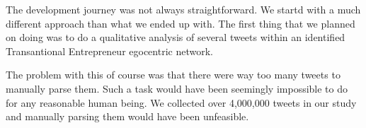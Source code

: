 The development journey was not always straightforward. We startd with a much different approach than what we ended up with. The first thing that we planned on doing was to do a qualitative analysis of several tweets within an identified Transantional Entrepreneur egocentric network.
\par
The problem with this of course was that there were way too many tweets to manually parse them. Such a task would have been seemingly impossible to do for any reasonable human being. We collected over 4,000,000 tweets in our study and manually parsing them would have been unfeasible.

